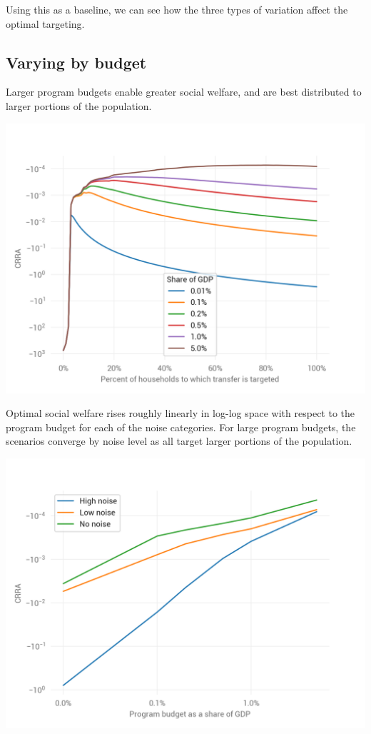 \documentclass[12pt]{article}
\begin{document}
Using this as a baseline, we can see how the three types of variation affect 
the optimal targeting.

\subsection{Varying by budget} \label{varying_by_budget}

Larger program budgets enable greater social welfare, and are best distributed 
to larger portions of the population.

\begin{center}
	\includegraphics{by_budget_0_Low_noise}  %
	\label{fig:by_budget_0_Low_noise}
\end{center}

Optimal social welfare rises roughly linearly in log-log space with respect to 
the program budget for each of the noise categories. For large program budgets, 
the scenarios converge by noise level as all target larger portions of the 
population.

\begin{center}
	\includegraphics{max_crra_by_size_noise}  %
	\label{fig:max_crra_by_size_noise}
\end{center}
\end{document}

